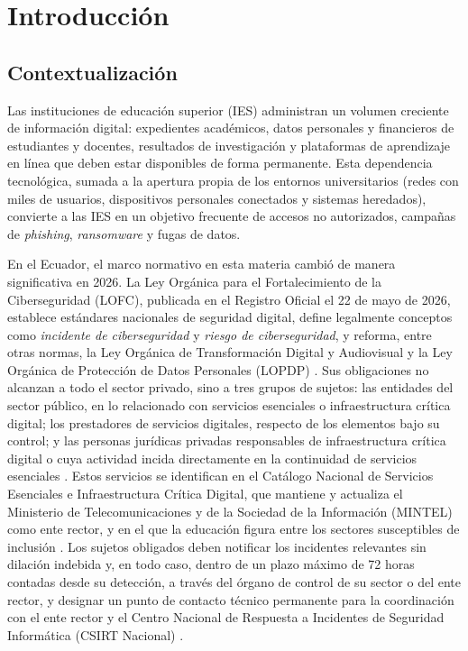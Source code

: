 \chapter{Introducción}
\label{chap:introduccion}

\section{Contextualización}
Las instituciones de educación superior (IES) administran un volumen creciente de información digital: expedientes académicos, datos personales y financieros de estudiantes y docentes, resultados de investigación y plataformas de aprendizaje en línea que deben estar disponibles de forma permanente. Esta dependencia tecnológica, sumada a la apertura propia de los entornos universitarios (redes con miles de usuarios, dispositivos personales conectados y sistemas heredados), convierte a las IES en un objetivo frecuente de accesos no autorizados, campañas de \textit{phishing}, \textit{ransomware} y fugas de datos.

En el Ecuador, el marco normativo en esta materia cambió de manera significativa en 2026. La Ley Orgánica para el Fortalecimiento de la Ciberseguridad (LOFC), publicada en el Registro Oficial el 22 de mayo de 2026, establece estándares nacionales de seguridad digital, define legalmente conceptos como \textit{incidente de ciberseguridad} y \textit{riesgo de ciberseguridad}, y reforma, entre otras normas, la Ley Orgánica de Transformación Digital y Audiovisual y la Ley Orgánica de Protección de Datos Personales (LOPDP) \cite{lofc2026}. Sus obligaciones no alcanzan a todo el sector privado, sino a tres grupos de sujetos: las entidades del sector público, en lo relacionado con servicios esenciales o infraestructura crítica digital; los prestadores de servicios digitales, respecto de los elementos bajo su control; y las personas jurídicas privadas responsables de infraestructura crítica digital o cuya actividad incida directamente en la continuidad de servicios esenciales \cite{lofc2026} . Estos servicios se identifican en el Catálogo Nacional de Servicios Esenciales e Infraestructura Crítica Digital, que mantiene y actualiza el Ministerio de Telecomunicaciones y de la Sociedad de la Información (MINTEL) como ente rector, y en el que la educación figura entre los sectores susceptibles de inclusión \cite{lofc2026}. Los sujetos obligados deben notificar los incidentes relevantes sin dilación indebida y, en todo caso, dentro de un plazo máximo de 72 horas contadas desde su detección, a través del órgano de control de su sector o del ente rector, y designar un punto de contacto técnico permanente para la coordinación con el ente rector y el Centro Nacional de Respuesta a Incidentes de Seguridad Informática (CSIRT Nacional) \cite{lofc2026} .

